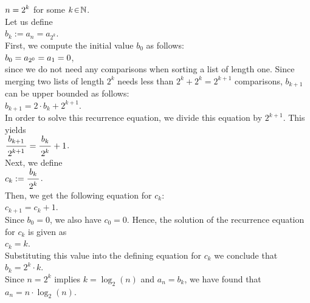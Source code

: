 \hspace*{1.3cm}
$\displaystyle n = 2^k$ \qquad for some $k \!\in\! \mathbb{N}$.
\\[0.2cm]
Let us define
\\[0.2cm]
\hspace*{1.3cm}
$b_k := a_n = a_{2^k}$.
\\[0.2cm]
First, we compute the initial value $b_0$ as follows:
\\[0.2cm]
\hspace*{1.3cm}
$\displaystyle b_0 = a_{2^0} = a_1 = 0$,
\\[0.2cm]
since we do not need any comparisons when sorting a list of length one.  Since merging two lists of
length $2^k$ needs less than  $2^k + 2^k = 2^{k+1}$ comparisons, $b_{k+1}$ can be upper bounded as follows:
\\[0.2cm]
\hspace*{1.3cm}
$b_{k+1} = 2 \cdot b_k + 2^{k+1}$. 
\\[0.2cm]
In order to solve this recurrence equation, we divide this equation by $2^{k+1}$.
This yields
\\[0.2cm]
\hspace*{1.3cm}
$\bruch{b_{k+1}}{2^{k+1}} = \bruch{b_k}{2^k} + 1$.
\\[0.2cm]
Next, we define
\\[0.2cm]
\hspace*{1.3cm}
$c_k := \bruch{b_k}{2^k}$.
\\[0.2cm]
Then, we get the following equation for $c_k$:
\\[0.2cm]
\hspace*{1.3cm}
$c_{k+1} = c_k + 1$.
\\[0.2cm]
Since $b_0 = 0$, we also have $c_0 = 0$.  Hence, the solution of the recurrence equation for $c_k$
is given as
\\[0.2cm]
\hspace*{1.3cm}
$c_k = k$.
\\[0.2cm]
Substituting this value into the defining equation for $c_k$ we conclude that
\\[0.2cm]
\hspace*{1.3cm}
$b_k = 2^k \cdot k$.
\\[0.2cm]
Since $n = 2^k$ implies $k = \log_2(n)$ and $a_n = b_k$, we have found that
\\[0.2cm]
\hspace*{1.3cm}
$a_n = n \cdot \log_2(n)$. 


